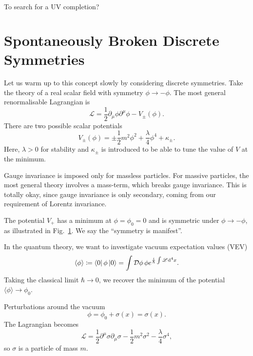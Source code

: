 To search for a UV completion?

\section{Spontaneously Broken Discrete Symmetries}%
\label{sec:spontaneously_broken_discrete_symmetries}

Let us warm up to this concept slowly by considering discrete symmetries.
Take the theory of a real scalar field with symmetry $\phi \to -\phi$.
The most general renormalisable Lagrangian is
\begin{equation}
  \mathscr{L} = \frac{1}{2} \partial_{\mu} \phi \partial^{\mu} \phi - V_{\pm}(\phi).
\end{equation}
There are two possible scalar potentials
\begin{equation}
  V_{\pm}(\phi) = \pm \frac{1}{2} m^2 \phi^2 + \frac{\lambda}{4} \phi^4 + \kappa_{\pm}.
\end{equation}
Here, $\lambda > 0$ for stability and $\kappa_{\pm}$ is introduced to be able to tune the value of $V$ at the minimum.
\begin{remark}
  Gauge invariance is imposed only for massless particles. For massive particles, the most general theory involves a mass-term, which breaks gauge invariance. This is totally okay, since gauge invariance is only secondary, coming from our requirement of Lorentz invariance.
\end{remark}

\begin{figure}[tbhp]
  \centering
  \def\svgwidth{0.4\columnwidth}
  
  \caption{}
  \label{fig:l14f1}
\end{figure}
The potential $V_+$ has a minimum at $\phi = \phi_0 = 0$ and is symmetric under $\phi \to -\phi$, as illustrated in Fig.~\ref{fig:l14f1}.
We say the ``symmetry is manifest''.

In the quantum theory, we want to investigate vacuum expectation values (VEV)
\begin{equation}
  \langle \phi \rangle \coloneqq \bra{0}\phi \ket{0} = \int \mathop{\mathcal{D} \phi} \phi e^{\frac{i}{\hbar} \int \mathscr{L} \dd[4]{x}}.
\end{equation}
Taking the classical limit $\hbar \to 0$, we recover the minimum of the potential $\langle \phi \rangle \to \phi_0$.

Perturbations around the vacuum
\begin{equation}
  \phi = \phi_0 + \sigma(x) = \sigma(x).
\end{equation}
The Lagrangian becomes
\begin{equation}
  \mathscr{L} = \frac{1}{2} \partial^{\mu} \sigma \partial_{\mu} \sigma - \frac{1}{2} m^2 \sigma^2 - \frac{\lambda}{4} \sigma^4,
\end{equation}
so  $\sigma$ is a particle of mass $m$.

